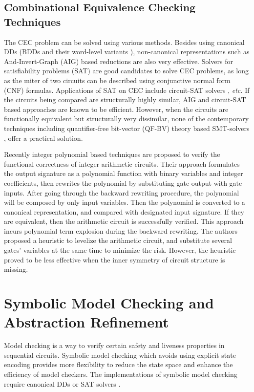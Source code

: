 \subsection{Combinational Equivalence Checking Techniques}
The CEC problem can be solved using various methods.
Besides using canonical DDs (BDDs
\cite{BRYA86} and their word-level variants \cite{WLS}),
non-canonical representations such as And-Invert-Graph (AIG) based reductions 
\cite{AIG:2002,alanmi:cec:iccad2006} are also very effective. 
Solvers for satisfiability problems (SAT) are good candidates to solve CEC problems,
as long as the miter of two circuits can be described using conjunctive normal form (CNF)
formulas. Applications of SAT on CEC include circuit-SAT solvers \cite{csat}, {\it etc.}
If the circuits being compared are structurally highly similar, AIG and circuit-SAT 
based approaches are known to be efficient.
However, when the circuits are functionally equivalent but structurally very dissimilar, none of the 
  contemporary techniques including quantifier-free bit-vector 
  (QF-BV) theory based SMT-solvers \cite{Cryptol:fmcad09},
  offer a practical solution.    


Recently integer polynomial based techniques \cite{ciesielski2014function,rolf:date16} are proposed  to verify the functional 
correctness of integer arithmetic circuits. Their approach formulates the output signature as a polynomial function 
with binary variables and integer coefficients, then rewrites the polynomial by substituting gate output with gate 
inputs. After going through the backward rewriting procedure,  the polynomial
will be composed by only input variables. Then the polynomial is converted to a canonical representation, and compared
with designated input signature. If they are equivalent, then the arithmetic circuit is successfully verified.
This approach incurs polynomial term explosion during the backward rewriting. The authors proposed a heuristic
to levelize the arithmetic circuit, and substitute several gates' variables at the same time to minimize the risk. However, 
the heuristic proved to be less effective when the inner symmetry of circuit structure is missing.

  
\section{Symbolic Model Checking and Abstraction Refinement}
Model checking is a way to verify certain safety and liveness properties 
in sequential circuits. Symbolic model checking which avoids using explicit state encoding
provides more flexibility to reduce the state space and enhance the 
efficiency of model checkers. The implementations of symbolic model checking 
require canonical DDs or SAT solvers \cite{burch1990sequential,burch1991representing,biere1999symbolic}.

